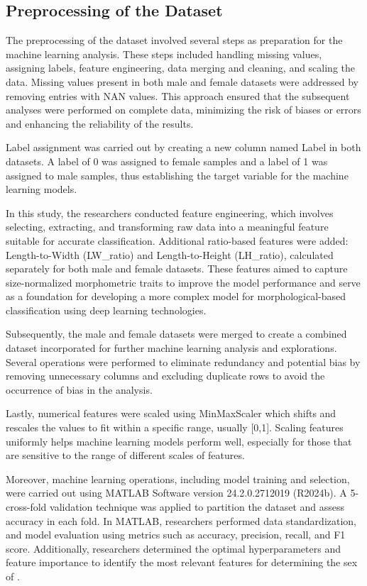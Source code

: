 \subsection{Preprocessing of the Dataset}
\label{sec:pre-processing}

The preprocessing of the dataset involved several steps as preparation for the machine learning analysis. These steps included handling missing values, assigning labels, feature engineering, data merging and cleaning, and scaling the data. Missing values present in both male and female datasets were addressed by removing entries with NAN values. This approach ensured that the subsequent analyses were performed on complete data, minimizing the risk of biases or errors and enhancing the reliability of the results.

Label assignment was carried out by creating a new column named Label in both datasets. A label of 0 was assigned to female samples and a label of 1 was assigned to male samples, thus establishing the target variable for the machine learning models.

In this study, the researchers conducted feature engineering, which involves selecting, extracting, and transforming raw data into a meaningful feature suitable for accurate classification. Additional ratio-based features were added: Length-to-Width (LW\_ratio) and Length-to-Height (LH\_ratio),  calculated separately for both male and female datasets.  These features aimed to capture size-normalized morphometric traits to improve the model performance and serve as a foundation for developing a more complex model for morphological-based classification using deep learning technologies. 

Subsequently, the male and female datasets were merged to create a combined dataset incorporated for further machine learning analysis and explorations. Several operations were performed to eliminate redundancy and potential bias by removing unnecessary columns and excluding duplicate rows to avoid the occurrence of bias in the analysis. 

Lastly, numerical features were scaled using MinMaxScaler which shifts and rescales the values to fit within a specific range, usually [0,1].  Scaling features uniformly helps machine learning models perform well, especially for those that are sensitive to the range of different scales of features.

Moreover, machine learning operations, including model training and selection, were carried out using MATLAB Software version 24.2.0.2712019 (R2024b). A 5-cross-fold validation technique was applied to partition the dataset and assess accuracy in each fold. In MATLAB, researchers performed data standardization, and model evaluation using metrics such as accuracy, precision, recall, and F1 score. Additionally, researchers determined the optimal hyperparameters and feature importance to identify the most relevant features for determining the sex of \Tgranosa.



